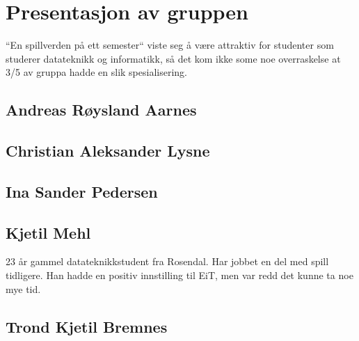 \section{Presentasjon av gruppen}
``En spillverden på ett semester`` viste seg å være attraktiv for
studenter som studerer datateknikk og informatikk, så det kom ikke some
noe overraskelse at 3/5 av gruppa hadde en slik spesialisering.

\subsection{Andreas Røysland Aarnes}

\subsection{Christian Aleksander Lysne}

\subsection{Ina Sander Pedersen}

\subsection{Kjetil Mehl}
23 år gammel datateknikkstudent fra Rosendal. Har jobbet en del med
spill tidligere. Han hadde en positiv innstilling til EiT, men var
redd det kunne ta noe mye tid.

\subsection{Trond Kjetil Bremnes}
